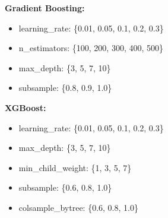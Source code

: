 \documentclass[conference]{IEEEtran}
\begin{document}
\textbf{Gradient Boosting:}
\begin{itemize}
    \item learning\_rate: \{0.01, 0.05, 0.1, 0.2, 0.3\}
    \item n\_estimators: \{100, 200, 300, 400, 500\}
    \item max\_depth: \{3, 5, 7, 10\}
    \item subsample: \{0.8, 0.9, 1.0\}
\end{itemize}

\textbf{XGBoost:}
\begin{itemize}
    \item learning\_rate: \{0.01, 0.05, 0.1, 0.2, 0.3\}
    \item max\_depth: \{3, 5, 7, 10\}
    \item min\_child\_weight: \{1, 3, 5, 7\}
    \item subsample: \{0.6, 0.8, 1.0\}
    \item colsample\_bytree: \{0.6, 0.8, 1.0\}
\end{itemize}
\end{document}
